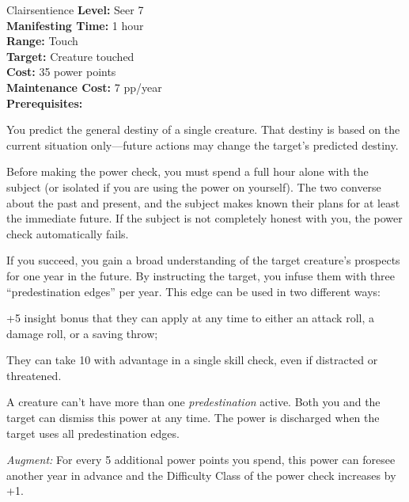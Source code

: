 {Clairsentience}
{
	\textbf{Level:}
	Seer 7\\
	\textbf{Manifesting Time:}
	1 hour\\
	\textbf{Range:}
	Touch\\
	\textbf{Target:}
	Creature touched\\
	\textbf{Cost:}
	35 power points\\
	\textbf{Maintenance Cost:}
	7 pp/year\\
	\textbf{Prerequisites:}
	\\
}
{
	You predict the general destiny of a single creature. That destiny is based on the current situation only---future actions may change the target's predicted destiny.

	Before making the power check, you must spend a full hour alone with the subject (or isolated if you are using the power on yourself). The two converse about the past and present, and the subject makes known their plans for at least the immediate future. If the subject is not completely honest with you, the power check automatically fails.

	If you succeed, you gain a broad understanding of the target creature's prospects for one year in the future. By instructing the target, you infuse them with three ``predestination edges'' per year. This edge can be used in two different ways:
	\begin{enumerate*}
	\item +5 insight bonus that they can apply at any time to either an attack roll, a damage roll, or a saving throw;
	\item They can take 10 with advantage in a single skill check, even if distracted or threatened.
	\end{enumerate*}

	A creature can't have more than one \emph{predestination} active. Both you and the target can dismiss this power at any time. The power is discharged when the target uses all predestination edges.

	\textit{Augment:} For every 5 additional power points you spend, this power can foresee another year in advance and the Difficulty Class of the power check increases by +1.
}